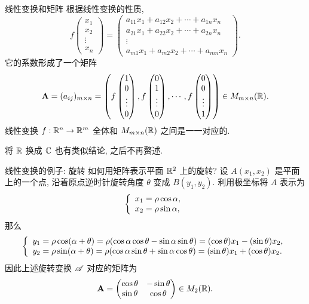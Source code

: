 \begin{frame}{线性变换和矩阵}
	\onslide<+->
	根据线性变换的性质,
	\[f\begin{pmatrix}
		x_1\\x_2\\\vdots\\x_n
	\end{pmatrix}=\begin{pmatrix}
		a_{11}x_1+a_{12}x_2+\cdots+a_{1n}x_n\\
		a_{21}x_1+a_{22}x_2+\cdots+a_{2n}x_n\\
		\vdots\\
		a_{m1}x_1+a_{m2}x_2+\cdots+a_{mn}x_n
	\end{pmatrix}.\]
	\onslide<+->
	它的系数形成了一个矩阵
	\[{\mathbf{A}}=(a_{ij})_{m\times n}=\left(f\begin{pmatrix}
		1\\0\\\vdots\\0
	\end{pmatrix},
	f\begin{pmatrix}
		0\\1\\\vdots\\0
	\end{pmatrix},\cdots,
	f\begin{pmatrix}
		0\\0\\\vdots\\1
	\end{pmatrix}\right)\in M_{m\times n}({\mathbb{R}}).\]
	\onslide<+->
	线性变换 $f:{\mathbb{R}}^n\to{\mathbb{R}}^m$ 全体和 $M_{m\times n}({\mathbb{R}})$ 之间是一一对应的.

	\onslide<+->
	将 ${\mathbb{R}}$ 换成 ${\mathbb{C}}$ 也有类似结论, 之后不再赘述.
\end{frame}


\begin{frame}{线性变换的例子: 旋转}
	\onslide<+->
	如何用矩阵表示平面 ${\mathbb{R}}^2$ 上的旋转?
	\onslide<+->
	设 $A(x_1,x_2)$ 是平面上的一个点, 沿着原点逆时针旋转角度 $\theta$ 变成 $B(y_1,y_2)$.
	\onslide<+->
	利用极坐标将 $A$ 表示为
	\[\left\{\begin{array}{l}x_1=\rho\cos\alpha,\\x_2=\rho\sin\alpha,\end{array}\right.\]
	那么
	\[\left\{\begin{array}{l}y_1=\rho\cos(\alpha+\theta)=\rho(\cos\alpha\cos\theta-\sin\alpha\sin\theta)=(\cos\theta)x_1-(\sin\theta)x_2,\\
	y_2=\rho\sin(\alpha+\theta)=\rho(\cos\alpha\sin\theta+\sin\alpha\cos\theta)=(\sin\theta)x_1+(\cos\theta)x_2.\end{array}\right.\]
	\onslide<+->
	因此上述旋转变换 $\mathscr{A}$ 对应的矩阵为
	\[{\mathbf{A}}=\begin{pmatrix}
		\cos\theta&-\sin\theta\\
		\sin\theta&\cos\theta
	\end{pmatrix}\in M_2({\mathbb{R}}).\]
\end{frame}


